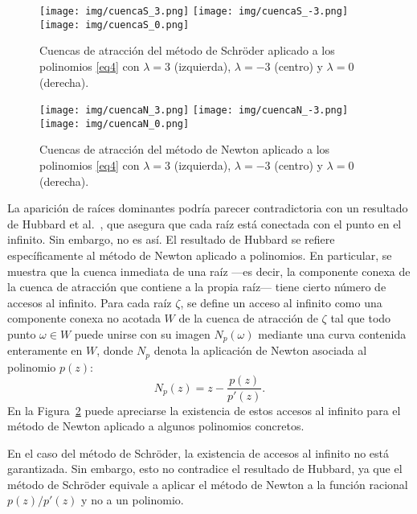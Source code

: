 \IfFileExists{aims.cls}{\documentclass{aims}}{\documentclass[11pt]{article}}
\numberwithin{equation}{section}
\newcommand{\includegraphics}[2][]{%
  }%
\renewcommand{\includegraphics}[2][]{%
  }%
\theoremstyle{thmstyleone}%
\theoremstyle{thmstyletwo}%
\theoremstyle{thmstylethree}%
\begin{document}
\begin{figure}[h]%
\centering
\texttt{[image: img/cuencaS\_3.png]}
\texttt{[image: img/cuencaS\_-3.png]}
\texttt{[image: img/cuencaS\_0.png]}
\caption{Cuencas de atracción del método de Schr\"oder aplicado a los polinomios \eqref{eq4} con $\lambda=3$ (izquierda), $\lambda=-3$ (centro) y $\lambda=0$ (derecha).}
\label{fig3}
\end{figure}


\begin{figure}[h]%
\centering
\texttt{[image: img/cuencaN\_3.png]}
\texttt{[image: img/cuencaN\_-3.png]}
\texttt{[image: img/cuencaN\_0.png]}
\caption{Cuencas de atracción del método de Newton aplicado a los polinomios \eqref{eq4} con $\lambda=3$ (izquierda), $\lambda=-3$ (centro) y $\lambda=0$ (derecha).}
\label{fig4}
\end{figure}



La aparición de raíces dominantes podría parecer contradictoria con un resultado de Hubbard et al.~\cite{15Hubbard}, que asegura que cada raíz está conectada con el punto en el infinito. Sin embargo, no es así. El resultado de Hubbard se refiere específicamente al método de Newton aplicado a polinomios. En particular, se muestra que la cuenca inmediata de una raíz —es decir, la componente conexa de la cuenca de atracción que contiene a la propia raíz— tiene cierto número de accesos al infinito. Para cada raíz $\zeta$, se define un acceso al infinito como una componente conexa no acotada $W$ de la cuenca de atracción de $\zeta$ tal que todo punto $\omega\in W$ puede unirse con su imagen $N_p(\omega)$ mediante una curva contenida enteramente en $W$, donde $N_p$ denota la aplicación de Newton asociada al polinomio $p(z)$:
$$
N_p(z)=z-\frac{p(z)}{p'(z)}.
$$
En la Figura~\ref{fig4} puede apreciarse la existencia de estos accesos al infinito para el método de Newton aplicado a algunos polinomios concretos.

En el caso del método de Schr\"oder, la existencia de accesos al infinito no está garantizada. Sin embargo, esto no contradice el resultado de Hubbard, ya que el método de Schröder equivale a aplicar el método de Newton a la función racional $p(z)/p'(z)$ y no a un polinomio.
\end{document}

